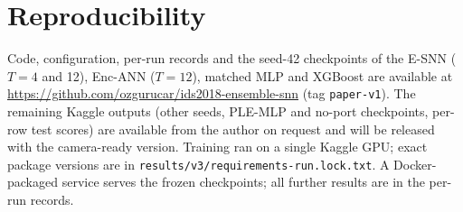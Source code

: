 \documentclass[conference]{IEEEtran}
\begin{document}
\section*{Reproducibility}

Code, configuration, per-run records and the seed-42 checkpoints of the E-SNN ($T{=}4$ and 12), Enc-ANN ($T{=}12$), matched MLP and XGBoost are available at \url{https://github.com/ozgurucar/ids2018-ensemble-snn} (tag \texttt{paper-v1}). The remaining Kaggle outputs (other seeds, PLE-MLP and no-port checkpoints, per-row test scores) are available from the author on request and will be released with the camera-ready version. Training ran on a single Kaggle GPU; exact package versions are in \texttt{results/v3/requirements-run.lock.txt}. A Docker-packaged service serves the frozen checkpoints; all further results are in the per-run records.



\end{document}
